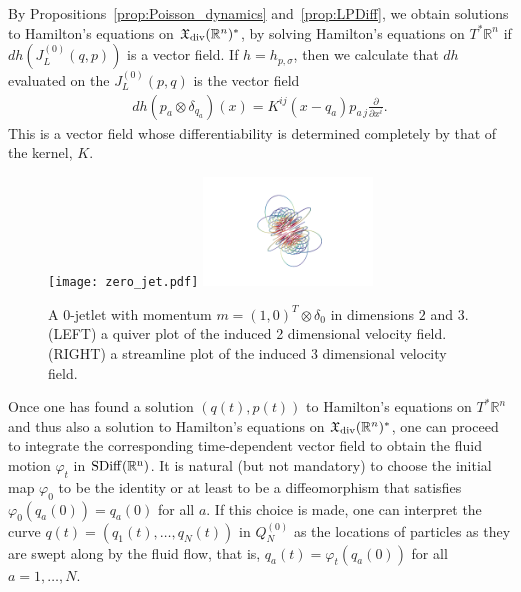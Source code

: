 \documentclass[12pt]{amsart}
\newcommand{\pder}[2]{\ensuremath{\frac{\partial #1}{\partial #2}}}
\newcommand{\R}{\ensuremath{\mathbb{R}}}
\begin{document}
By Propositions~\ref{prop:Poisson_dynamics} and~\ref{prop:LPDiff},
we obtain solutions to Hamilton's equations
on $\mathfrak{X}_{\rm div}(\R^n)^*$, by solving
Hamilton's equations on $T^*\R^n$ if $dh( J_L^{(0)}(q,p) )$ is
a vector field.  If $h = h_{p,\sigma}$, then we calculate that $dh$
evaluated on the $J_L^{(0)}(p,q)$ is the vector field
\begin{align*}
	dh( p_a \otimes \delta_{q_a} )  (x) = K^{ij}(x - q_a) p_{a\,j} \pder{}{x^i}.
\end{align*}
This is a vector field whose differentiability is determined completely by that of
the kernel, $K$.
\begin{figure}
	\centering
	\texttt{[image: zero\_jet.pdf]}
	\includegraphics[width = 0.4\textwidth]{zero_jet_3D.png}
	\caption{A $0$-jetlet with momentum $m = (1,0)^T \otimes \delta_0$ in dimensions $2$ and $3$.
	(LEFT) a quiver plot of the induced 2 dimensional velocity field.
	(RIGHT) a streamline plot of the induced 3 dimensional velocity field. }
	\label{fig:zero_jetlet}
\end{figure}
Once one has found a solution $(q(t), p(t))$ to Hamilton's equations on $T^*\mathbb{R}^n$ and thus also a solution to Hamilton's equations on $\mathfrak{X}_{\rm div}(\mathbb{R}^n)^*$, one can proceed to integrate the corresponding time-dependent vector field to obtain the fluid motion $\varphi_t$ in $\rm{SDiff}(\mathbb{R}^n)$. It is natural (but not mandatory) to choose the initial map $\varphi_0$ to be the identity or at least to be a diffeomorphism that satisfies $\varphi_0(q_a(0))= q_a(0)$ for all $a$.
  If this choice is made, one can interpret the curve $q(t) = (q_1(t), \ldots, q_N(t))$ in $Q_N^{(0)}$ as the locations of particles as they are swept along by the fluid flow, that is, $q_a(t) = \varphi_t(q_a(0))$ for all $a = 1, \ldots, N$. 
  
\end{document}
